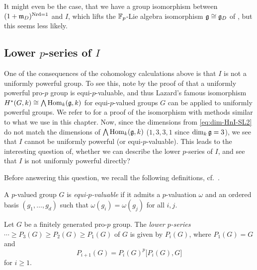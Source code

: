 It might even be the case, that we have a group isomorphism between $(1+\mathfrak{m}_{D})^{\operatorname{Nrd} = 1}$ and $I$, which lifts the $\mathbb{F}_{p}$-Lie algebra isomorphism $\mathfrak{g} \cong \mathfrak{g}_{D}$ of , but this seems less likely.

\subsection{Lower \texorpdfstring{$p$}{p}-series of \texorpdfstring{$I$}{I}}%
\label{subsec:lower-p-series-SL2}

One of the consequences of the cohomology calculations above is that $I$ is not a uniformly powerful group. To see this, note by the proof of \cite[Thm.~3.3.3]{Laz-complements} that a uniformly powerful pro-$p$ group is equi-$p$-valuable, and thus Lazard's famous isomorphism $H^{*}(G,k) \cong \bigwedge \operatorname{Hom}_{k}(\mathfrak{g},k)$ for equi-$p$-valued groups $G$ can be applied to uniformly powerful groups. We refer to \cite[Cor.~6.3]{Sor} for a proof of the isomorphism with methods similar to what we use in this chapter. Now, since the dimensions from \eqref{eq:dim-HnI-SL2} do not match the dimensions of $\bigwedge \operatorname{Hom}_{k}(\mathfrak{g},k)$ ($1,3,3,1$ since $\dim_{k} \mathfrak{g} = 3$), we see that $I$ cannot be uniformly powerful (or equi-$p$-valuable). This leads to the interesting question of, whether we can describe the lower $p$-series of $I$, and see that $I$ is not uniformly powerful directly?

Before answering this question, we recall the following definitions, cf.\ \cite[Def.~1.15, Cor.~1.20, Def.~3.1 and Def.~4.1]{analytic_pro-p_groups}.
\begin{definition}
  A $p$-valued group $G$ is \emph{equi-$p$-valuable} if it admits a $p$-valuation $\omega$ and an ordered basis $(g_{1},\dotsc,g_{d})$ such that $\omega(g_{i}) = \omega(g_{j})$ for all $i,j$.
\end{definition}

\begin{definition}
  Let $G$ be a finitely generated pro-$p$ group. The \emph{lower $p$-series} $\dotsb \geq P_{3}(G) \geq P_{2}(G) \geq P_{1}(G)$ of $G$ is given by $P_{i}(G)$, where $P_{1}(G) = G$ and
  \begin{equation*}
    P_{i+1}(G) = P_{i}(G)^{p}\bigl[ P_{i}(G),G \bigr]
  \end{equation*}
  for $i \geq 1$.
\end{definition}

